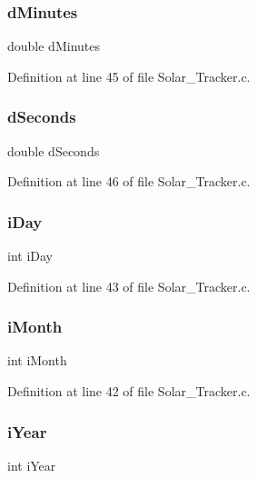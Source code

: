 \subsubsection{\texorpdfstring{d\+Minutes}{dMinutes}}
{\footnotesize\ttfamily double d\+Minutes}



Definition at line 45 of file Solar\+\_\+\+Tracker.\+c.

\mbox{\label{structc_time_ac79c811f4c4df0809def02bfd4ff5b4d}} 
\subsubsection{\texorpdfstring{d\+Seconds}{dSeconds}}
{\footnotesize\ttfamily double d\+Seconds}



Definition at line 46 of file Solar\+\_\+\+Tracker.\+c.

\mbox{\label{structc_time_a30a53332a9eaa6d190792a94928b8e0b}} 
\subsubsection{\texorpdfstring{i\+Day}{iDay}}
{\footnotesize\ttfamily int i\+Day}



Definition at line 43 of file Solar\+\_\+\+Tracker.\+c.

\mbox{\label{structc_time_a911b960ed333938ce939488afab15121}} 
\subsubsection{\texorpdfstring{i\+Month}{iMonth}}
{\footnotesize\ttfamily int i\+Month}



Definition at line 42 of file Solar\+\_\+\+Tracker.\+c.

\mbox{\label{structc_time_aff44b11da9adef57c6766912ab82bf7d}} 
\subsubsection{\texorpdfstring{i\+Year}{iYear}}
{\footnotesize\ttfamily int i\+Year}



